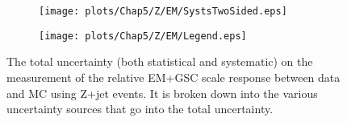 \begin{figure}[!ht]
\captionsetup[subfigure]{labelformat=empty}
 \begin{center}
   \begin{subfigure}{0.55\textwidth}
     \hspace{-3cm}
     \texttt{[image: plots/Chap5/Z/EM/SystsTwoSided.eps]}
   \end{subfigure}
   \begin{subfigure}{0.55\textwidth}     \hspace{-3cm}
     \texttt{[image: plots/Chap5/Z/EM/Legend.eps]}
   \end{subfigure}
 \end{center}
 \caption[Uncertainty on the EM+GSC scale response measurement using Z+jet]
 {\small The total uncertainty (both statistical and systematic) on the measurement of the relative EM+GSC scale response between data and MC using Z+jet events.  It is broken down 
into the various uncertainty sources that go into the total uncertainty.  }
 \label{Fig:ZJetSystsEM2016}
\end{figure}

